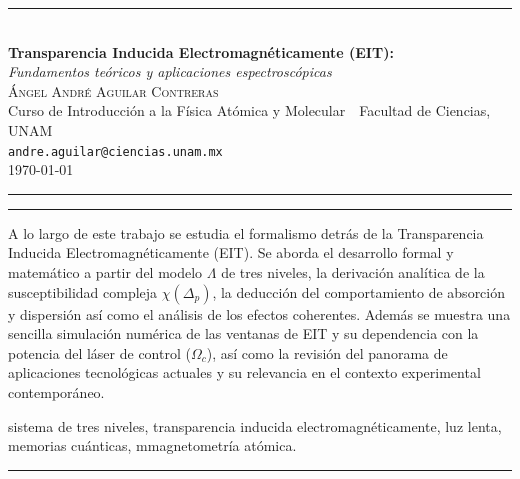 \documentclass[11pt,letterpaper]{article}
\date{\today}
\newcommand{\titulo}{Transparencia Inducida Electromagnéticamente (EIT):}
\newcommand{\subtitulo}{Fundamentos teóricos y aplicaciones espectroscópicas}
\newcommand{\autor}{Ángel André Aguilar Contreras}
\begin{document}
\begin{center}
  {\color{ocre}\rule{0.5\textwidth}{0.8pt}}\\[1.1em]
  {\LARGE\bfseries\color{navaMidnight} \titulo}\\[0.45em]
  {\large\itshape \subtitulo}\\[1.2em]
  {\scshape\large \autor}\\[0.35em]
  {\small Curso de Introducción a la Física Atómica y Molecular\ \textperiodcentered\ Facultad de Ciencias, UNAM\\
   \texttt{andre.aguilar@ciencias.unam.mx}}\\[0.5em]
  {\small \today}\\[0.6em]
  {\color{ocre}\rule{0.5\textwidth}{0.8pt}}
\end{center}
\vspace{0.6em}

\begin{center}
\begin{minipage}{0.88\textwidth}
  {\color{adobe}\rule{\linewidth}{0.6pt}}\par\vspace{0.6em}
  \small
  A lo largo de este trabajo se estudia el formalismo detrás de la Transparencia Inducida Electromagnéticamente (EIT). Se aborda el desarrollo formal y matemático a partir del modelo $\Lambda$ de tres niveles, la derivación analítica de la susceptibilidad compleja $\chi(\Delta_p)$, la deducción del comportamiento de absorción y dispersión así como el análisis de los efectos coherentes. Además se muestra una sencilla simulación numérica de las ventanas de EIT y su dependencia con la potencia del láser de control ($\Omega_c$), así como la revisión del panorama de aplicaciones tecnológicas actuales y su relevancia en el contexto experimental contemporáneo.
  
  \par\vspace{0.7em}
   sistema de tres niveles, transparencia inducida electromagnéticamente, luz lenta, memorias cuánticas, mmagnetometría atómica.
  \par\vspace{0.6em}
  {\color{adobe}\rule{\linewidth}{0.6pt}}
\end{minipage}
\end{center}
\vspace{1.2em}




\nocite{*}
\newpage

\end{document}
